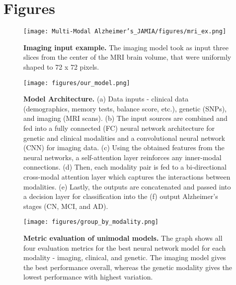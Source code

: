 \documentclass[11pt]{article}
\begin{document}
\newpage
\section*{Figures}
\begin{figure}[h!]
\begin{center}
  \caption{\textbf{Imaging input example.} The imaging model took as input three slices from the center of the MRI brain volume, that were uniformly shaped to 72 x 72 pixels.}
  \label{fig:mri}
  \texttt{[image: Multi-Modal Alzheimer's\_JAMIA/figures/mri\_ex.png]}
 \end{center}
\end{figure}


\begin{figure}[H]
\begin{center}
    \caption{\textbf{Model Architecture.} (a) Data inputs - clinical data (demographics, memory tests, balance score, etc.), genetic (SNPs), and imaging (MRI scans). (b) The input sources are combined and fed into a fully connected (FC) neural network architecture for genetic and clinical modalities and a convolutional neural network (CNN) for imaging data. (c) Using the obtained features from the neural networks, a self-attention layer reinforces any inner-modal connections. (d) Then, each modality pair is fed to a bi-directional cross-modal attention layer which captures the interactions between modalities. (e) Lastly, the outputs are concatenated and passed into a decision layer for classification into the (f) output Alzheimer’s stages (CN, MCI, and AD).}
  \texttt{[image: figures/our\_model.png]}
  \label{fig:arch}
  \end{center}

\end{figure}

\begin{figure}[h!]
\begin{center} 
    \caption{\textbf{Metric evaluation of unimodal models.} The graph shows all four evaluation metrics for the best neural network model for each modality - imaging, clinical, and genetic. The imaging model gives the best performance overall, whereas the genetic modality gives the lowest performance with highest variation.}
    \label{fig:uni}
  \texttt{[image: figures/group\_by\_modality.png]}

  \end{center}
\end{figure}
\end{document}

